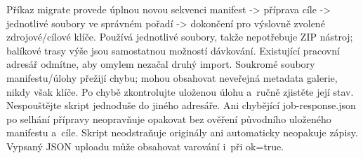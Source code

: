 \documentclass[11pt,a4paper]{article}
\begin{document}
Příkaz migrate provede úplnou novou sekvenci manifest -> příprava cíle -> jednotlivé soubory
ve správném pořadí -> dokončení pro výslovně zvolené zdrojové/cílové klíče. Používá
jednotlivé soubory, takže nepotřebuje ZIP nástroj; balíkové trasy výše jsou samostatnou
možností dávkování. Existující pracovní adresář odmítne, aby omylem nezačal druhý import.
Soukromé soubory manifestu/úlohy přežijí chybu; mohou obsahovat neveřejná metadata galerie,
nikdy však klíče. Po chybě zkontrolujte uloženou úlohu a~ručně zjistěte její stav.
Nespouštějte skript jednoduše do jiného adresáře. Ani chybějící job-response.json po selhání
přípravy neopravňuje opakovat bez ověření původního uloženého manifestu a~cíle. Skript
neodstraňuje originály ani automaticky neopakuje zápisy. Vypsaný JSON uploadu může obsahovat
varování i~při ok=true.
\end{document}
